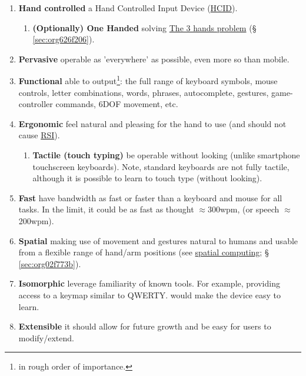 \documentclass[logo,bsc,singlespacing,parskip]{infthesis}
\begin{document}
\begin{enumerate}
\item \textbf{Hand controlled} a Hand Controlled Input Device (\hyperref[orgc00eca5]{HCID}).

\begin{enumerate}
\item \textbf{(Optionally) One Handed} solving \hyperref[sec:org626f206]{The 3 hands problem} (§ \ref{sec:org626f206}).
\end{enumerate}

\item \textbf{Pervasive} operable as 'everywhere' as possible, even more so than mobile.

\item \textbf{Functional} able to output\footnote{in rough order of importance.}: the full range of keyboard symbols, mouse controls, letter combinations, words, phrases, autocomplete, gestures, game-controller commands, 6DOF movement, etc.

\item \textbf{Ergonomic} feel natural and pleasing for the hand to use (and should not cause \hyperref[orgdb95c62]{RSI}).

\begin{enumerate}
\item \textbf{Tactile (touch typing)} be operable without looking (unlike smartphone touchscreen keyboards). Note, standard keyboards are not fully tactile, although it is possible to learn to touch type (without looking).
\end{enumerate}

\item \textbf{Fast} have bandwidth as fast or faster than a keyboard and mouse for all tasks. In the limit, it could be as fast as thought \(\approx\)300wpm, (or speech \(\approx\)200wpm).

\item \textbf{Spatial} making use of movement and gestures natural to humans and usable from a flexible range of hand/arm positions (see \hyperref[sec:org02f773b]{spatial computing}; § \ref{sec:org02f773b}).

\item \textbf{Isomorphic} leverage familiarity of known tools. For example, providing access to a keymap similar to QWERTY. would make the device easy to learn.

\item \textbf{Extensible} it should allow for future growth and be easy for users to modify/extend.
\end{enumerate}
\end{document}
